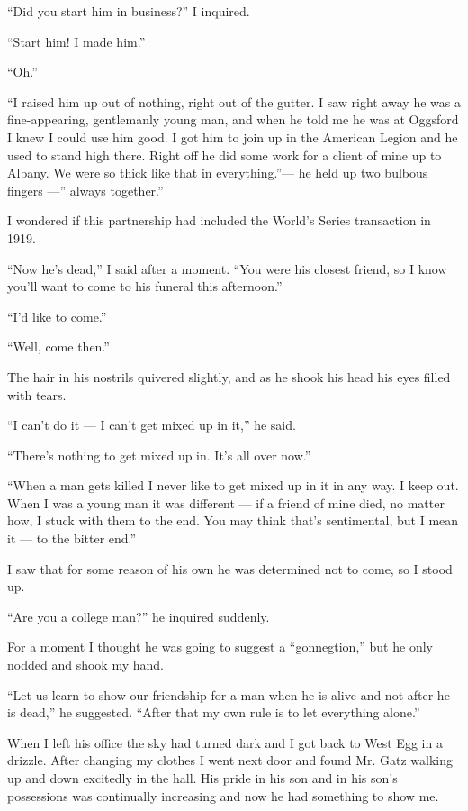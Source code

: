 \documentclass{znotebook}
\begin{document}
``Did you start him in business?'' I inquired.

``Start him! I made him.''

``Oh.''

``I raised him up out of nothing, right out of the gutter. I saw right away he was a fine-appearing, gentlemanly young man, and when he told me he was at Oggsford I knew I could use him good. I got him to join up in the American Legion and he used to stand high there. Right off he did some work for a client of mine up to Albany. We were so thick like that in everything.''---{} he held up two bulbous fingers ---'' always together.''

I wondered if this partnership had included the World's Series transaction in 1919.

``Now he's dead,'' I said after a moment. ``You were his closest friend, so I know you'll want to come to his funeral this afternoon.''

``I'd like to come.''

``Well, come then.''

The hair in his nostrils quivered slightly, and as he shook his head his eyes filled with tears.

``I can't do it ---{} I can't get mixed up in it,'' he said.

``There's nothing to get mixed up in. It's all over now.''

``When a man gets killed I never like to get mixed up in it in any way. I keep out. When I was a young man it was different ---{} if a friend of mine died, no matter how, I stuck with them to the end. You may think that's sentimental, but I mean it ---{} to the bitter end.''

I saw that for some reason of his own he was determined not to come, so I stood up.

``Are you a college man?'' he inquired suddenly.

For a moment I thought he was going to suggest a ``gonnegtion,'' but he only nodded and shook my hand.

``Let us learn to show our friendship for a man when he is alive and not after he is dead,'' he suggested. ``After that my own rule is to let everything alone.''

When I left his office the sky had turned dark and I got back to West Egg in a drizzle. After changing my clothes I went next door and found Mr. Gatz walking up and down excitedly in the hall. His pride in his son and in his son's possessions was continually increasing and now he had something to show me.
\end{document}
